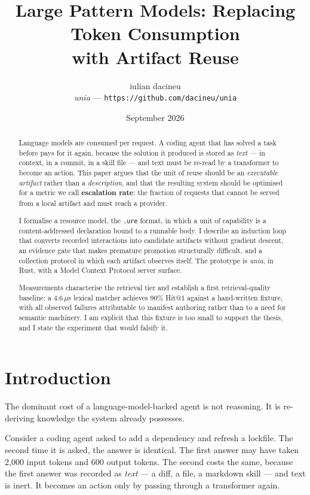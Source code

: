 \documentclass[11pt,twocolumn]{article}
\title{\textbf{Large Pattern Models: Replacing Token Consumption\\
with Artifact Reuse}}
\author{iulian dacineu\\
\textit{unia} --- \texttt{https://github.com/dacineu/unia}}
\date{September 2026}
\begin{document}
\maketitle

\begin{abstract}
Language models are consumed per request. A coding agent that has solved a task
before pays for it again, because the solution it produced is stored as
\emph{text} --- in context, in a commit, in a skill file --- and text must be
re-read by a transformer to become an action. This paper argues that the unit of
reuse should be an \emph{executable artifact} rather than a \emph{description},
and that the resulting system should be optimised for a metric we call
\textbf{escalation rate}: the fraction of requests that cannot be served from a
local artifact and must reach a provider.

I formalise a resource model, the \texttt{.ure} format, in which a unit of
capability is a content-addressed declaration bound to a runnable body. I
describe an induction loop that converts recorded interactions into candidate
artifacts without gradient descent, an evidence gate that makes premature
promotion structurally difficult, and a collection protocol in which each
artifact observes itself. The prototype is \emph{unia}, in Rust, with a Model
Context Protocol server surface.

Measurements characterise the retrieval tier and establish a first
retrieval-quality baseline: a $4.6\,\mu$s lexical matcher achieves 90\% Hit@1
against a hand-written fixture, with all observed failures attributable to
manifest authoring rather than to a need for semantic machinery. I am explicit
that this fixture is too small to support the thesis, and I state the experiment
that would falsify it.
\end{abstract}

\section{Introduction}

The dominant cost of a language-model-backed agent is not reasoning. It is
re-deriving knowledge the system already possesses.

Consider a coding agent asked to add a dependency and refresh a lockfile. The
second time it is asked, the answer is identical. The first answer may have
taken 2{,}000 input tokens and 600 output tokens. The second costs the same,
because the first answer was recorded as \emph{text} --- a diff, a file, a
markdown skill --- and text is inert. It becomes an action only by passing
through a transformer again.
\end{document}
